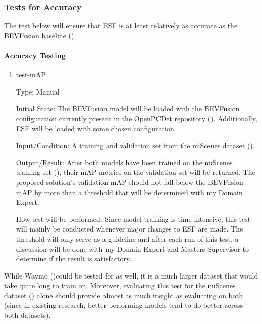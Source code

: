 \documentclass[12pt, titlepage]{article}
\newcommand{\ProjectName}{ESF }
\begin{document}
\subsubsection{Tests for Accuracy}

The test below will ensure that \ProjectName{}is at least relatively as accurate as the BEVFusion baseline (\cite{liang2022bevfusion}).
		
\paragraph{Accuracy Testing}

\begin{enumerate}

\item{test-mAP\\}

Type: Manual
					
Initial State: The BEVFusion model will be loaded with the BEVFusion configuration currently present in the OpenPCDet repository (\cite{openpcdet2020}).
Additionally, \ProjectName{}will be loaded with some chosen configuration.
					
Input/Condition: A training and validation set from the nuScenes dataset (\cite{caesar2020nuscenes}).
					
Output/Result: After both models have been trained on the nuScenes training set (\cite{caesar2020nuscenes}), their mAP metrics on the validation set will be returned. The
proposed solution's validation mAP should not fall below the BEVFusion mAP by more than a threshold that will be determined with my Domain Expert.
					
How test will be performed: Since model training is time-intensive, this test will mainly be conducted whenever major changes to \ProjectName{}are made.
The threshold will only serve as a guideline and after each run of this test, a discussion will be done with my Domain Expert and Masters Supervisor to determine
if the result is satisfactory.

\end{enumerate}

While Waymo (\cite{sun2020scalability})could be tested for as well, it is a much larger dataset that would take quite long to train on. Moreover, evaluating this test for the nuScenes dataset (\cite{caesar2020nuscenes})
alone should provide almost as much insight as evaluating on both (since in existing research, better performing models tend to do better across both datasets).
\end{document}
